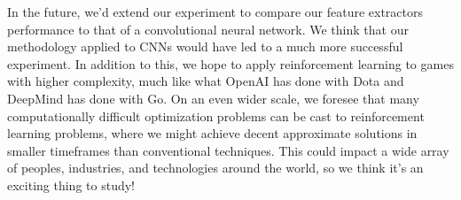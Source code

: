 \documentclass{article}
\begin{document}
In the future, we'd extend our experiment to compare our feature extractors performance to that of a convolutional neural network. 
We think that our methodology applied to CNNs would have led to a much more successful experiment. 
In addition to this, we hope to apply reinforcement learning to games with higher complexity, much like what OpenAI has done with Dota and DeepMind has done with Go.
On an even wider scale, we foresee that many computationally difficult optimization problems can be cast to reinforcement learning problems, where we might achieve decent approximate solutions in smaller timeframes than conventional techniques.
This could impact a wide array of peoples, industries, and technologies around the world, so we think it's an exciting thing to study!



\end{document}

